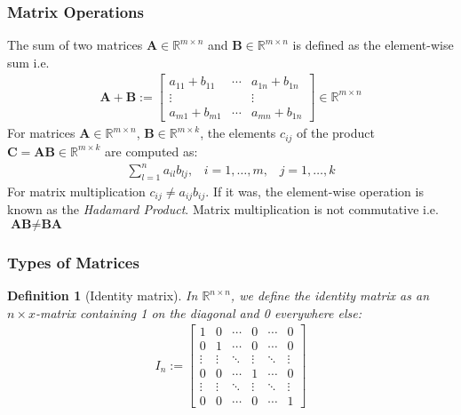 \documentclass{article}
\newtheorem{definition}{Definition}[section]
\begin{document}
	\subsubsection{Matrix Operations}
	The sum of two matrices $\textbf{A} \in \mathbb{R}^{m \times n}$ and $\textbf{B} \in \mathbb{R}^{m \times n}$ is defined as the element-wise sum i.e.
	\begin{align}
		\textbf{A} + \textbf{B} := \begin{bmatrix}
			a_{11} + b_{11} & \cdots & a_{1n} + b_{1n} \\
			\vdots & & \vdots \\
			a_{m1} + b_{m1} & \cdots & a_{mn} + b_{1n} 
		\end{bmatrix} \in \mathbb{R}^{m \times n}
	\end{align}
	For matrices $\textbf{A} \in \mathbb{R}^{m \times n}$, $\textbf{B} \in \mathbb{R}^{m \times k}$, the elements $c_{ij}$ of the product $\textbf{C} = \textbf{AB} \in \mathbb{R}^{m \times k}$ are computed as:
	\begin{align}
		 \sum_{l=1}^{n} a_{il}b_{lj}, \hspace{10pt} i = 1, \ldots,m, \hspace{10pt} j = 1, \ldots, k
	\end{align}
	For matrix multiplication $c_{ij} \ne a_{ij}b_{ij}$. If it was, the element-wise operation is known as the \textit{Hadamard Product}. Matrix multiplication is not commutative i.e. $\textbf{AB} \ne \textbf{BA}$
	\subsubsection{Types of Matrices}
	\begin{definition}[Identity matrix]
		\normalfont In $\mathbb{R}^{n \times n}$, we define the identity matrix as an $n  \times  x$-matrix containing 1 on the diagonal and 0 everywhere else:
		\begin{align}
			I_n := \begin{bmatrix}
				1 & 0 & \cdots & 0 & \cdots & 0 \\
				0 & 1 & \cdots & 0 & \cdots & 0 \\
				\vdots & \vdots & \ddots & \vdots & \ddots & \vdots \\
				0 & 0 & \cdots & 1 & \cdots & 0 \\
				\vdots & \vdots & \ddots & \vdots & \ddots & \vdots \\
				0 & 0 & \cdots & 0 & \cdots & 1 
			\end{bmatrix}
		\end{align} 
	\end{definition}
\end{document}
